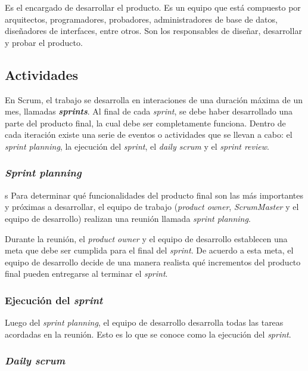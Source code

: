 Es el encargado de desarrollar el producto. Es un equipo que está compuesto por arquitectos, programadores, probadores, administradores de base de datos, diseñadores de interfaces, entre otros. Son los responsables de diseñar, desarrollar y probar el producto. \cite{SCRM12}

\subsection{Actividades}

En Scrum, el trabajo se desarrolla en interaciones de una duración máxima de un mes, llamadas \textit{\textbf{sprints}}. Al final de cada \textit{sprint}, se debe haber desarrollado una parte del producto final, la cual debe ser completamente funciona. Dentro de cada iteración existe una serie de eventos o actividades que se llevan a cabo: el \textit{sprint planning}, la ejecución del \textit{sprint}, el \textit{daily scrum} y el \textit{sprint review}.\cite{SCRM12}

\subsubsection{\textit{Sprint planning}}s
Para determinar qué funcionalidades del producto final son las más importantes y próximas a desarrollar, el equipo de trabajo (\textit{product owner}, \textit{ScrumMaster} y el equipo de desarrollo) realizan una reunión llamada \textit{sprint planning}.\cite{SCRM12}

Durante la reunión, el \textit{product owner} y el equipo de desarrollo establecen una meta que debe ser cumplida para el final del \textit{sprint}. De acuerdo a esta meta, el equipo de desarrollo decide de una manera realista qué incrementos del producto final pueden entregarse al terminar el \textit{sprint}.\cite{SCRM12}

\subsubsection{Ejecución del \textit{sprint}}

Luego del \textit{sprint planning}, el equipo de desarrollo desarrolla todas las tareas acordadas en la reunión. Esto es lo que se conoce como la ejecución del \textit{sprint}.\cite{SCRM12}

\subsubsection{\textit{Daily scrum}}

